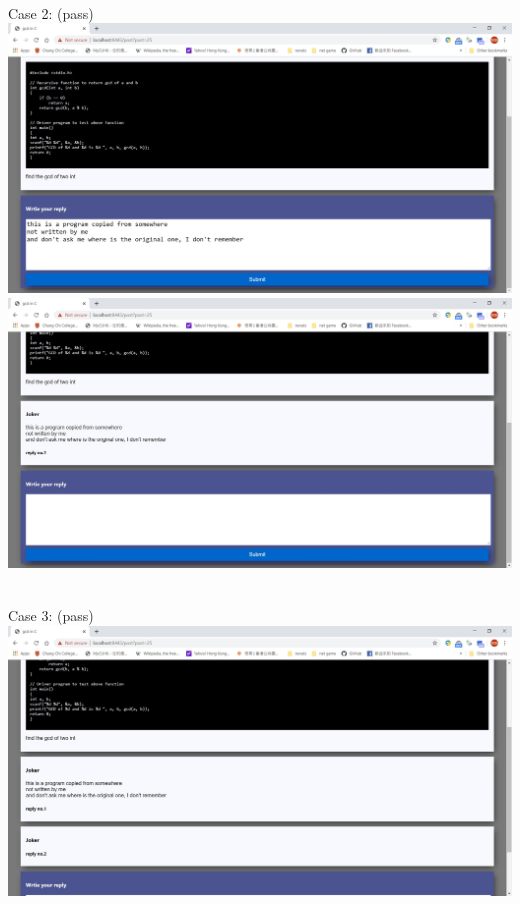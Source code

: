 ~

Case 2: (pass)\\
\includegraphics[scale=0.45]{Doc/Pics/case-8-3-2-1}\\
\includegraphics[scale=0.45]{Doc/Pics/case-8-3-2-2}\\

~

Case 3: (pass)\\
\includegraphics{Doc/Pics/case-8-3-3}\\

